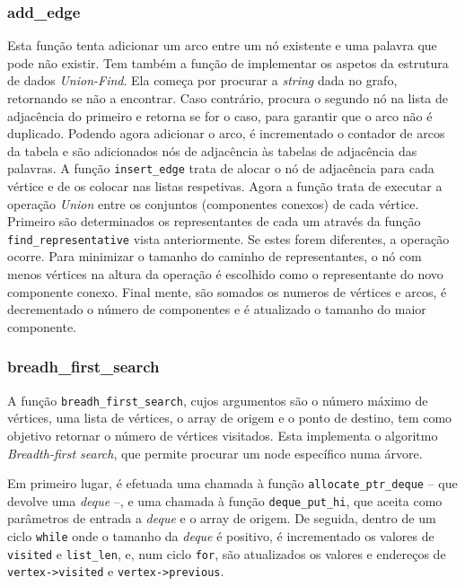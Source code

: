 \documentclass[portuguese,11pt,a4paper,titlepage]{article}
\newcommand{\foreign}[1]{\textit{#1}}
\begin{document}
\subsubsection{add\_edge}
Esta função tenta adicionar um arco entre um nó existente e uma palavra que pode não
existir. Tem também a função de implementar os aspetos da estrutura de dados
\foreign{Union-Find}. Ela começa por procurar a \foreign{string} dada no grafo,
retornando se não
a encontrar. Caso contrário, procura o segundo nó na lista de adjacência do primeiro e
retorna se for o caso, para garantir que o arco não é duplicado. Podendo agora adicionar
o arco, é incrementado o contador de arcos da tabela e são adicionados nós de adjacência
às tabelas de adjacência das palavras. A função \verb|insert_edge| trata de alocar o nó
de adjacência para cada vértice e de os colocar nas listas respetivas. Agora a função
trata de executar a operação \foreign{Union} entre os conjuntos (componentes conexos)
de cada vértice. Primeiro são determinados os representantes de cada um através da função
\verb|find_representative| vista anteriormente. Se estes forem diferentes, a operação
ocorre. Para minimizar o tamanho do caminho de representantes, o nó com menos vértices
na altura da operação é escolhido como o representante do novo componente conexo. Final%
mente, são somados os numeros de vértices e arcos, é decrementado o número de componentes
e é atualizado o tamanho do maior componente.

\subsubsection{breadh\_first\_search}
A função \verb|breadh_first_search|, cujos argumentos são o número máximo de vértices, uma lista de vértices, o array de origem e o ponto de destino, tem como objetivo retornar o número de vértices visitados. Esta implementa o algoritmo \textit{Breadth-first search}, que permite procurar um node específico numa árvore.

Em primeiro lugar, é efetuada uma chamada à função \verb|allocate_ptr_deque| -- que devolve uma \textit{deque} --, e uma chamada à função \verb|deque_put_hi|, que aceita como parâmetros de entrada a \textit{deque} e o array de origem. De seguida, dentro de um ciclo \verb|while| onde o tamanho da \textit{deque} é positivo, é incrementado os valores de \verb|visited| e \verb|list_len|, e, num ciclo \verb|for|, são atualizados os valores e endereços de \verb|vertex->visited| e \verb|vertex->previous|.
\end{document}
